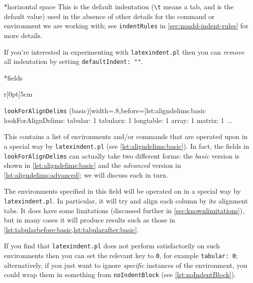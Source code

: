 *{horizontal space}
	This is the default indentation (\lstinline!\t! means a tab, and is the default value) used in the absence of other details
	for the command or environment we are working with; see \texttt{indentRules} in \vref{sec:noadd-indent-rules}
	for more details.

	If you're interested in experimenting with \texttt{latexindent.pl} then you
	can \emph{remove} all indentation by setting \texttt{defaultIndent: ""}.

*{fields}
	\begin{wrapfigure}[12]{r}[0pt]{5cm}
		\begin{yaml}[numbers=none]{\texttt{lookForAlignDelims} (basic)}[width=.8\linewidth,before=\centering]{lst:aligndelims:basic}
lookForAlignDelims:
   tabular: 1
   tabularx: 1
   longtable: 1
   array: 1
   matrix: 1
   ...
	\end{yaml}
	\end{wrapfigure}
	This contains a list of environments and/or commands that
	are operated upon in a special way by \texttt{latexindent.pl} (see \cref{lst:aligndelims:basic}).
	In fact, the fields in \texttt{lookForAlignDelims} can actually
	take two different forms: the \emph{basic} version is shown in \cref{lst:aligndelims:basic}
	and the \emph{advanced} version in \cref{lst:aligndelims:advanced}; we will discuss each in turn.

	The environments specified in this field will be operated on in a special way  by \texttt{latexindent.pl}. In particular, it will try and align each column by its alignment
	tabs. It does have some limitations (discussed further in \cref{sec:knownlimitations}),
	but in many cases it will produce results such as those in \cref{lst:tabularbefore:basic,lst:tabularafter:basic}.

	If you find that \texttt{latexindent.pl} does not perform satisfactorily on such
	environments then you can set the relevant key to \texttt{0}, for example \texttt{tabular: 0}; alternatively, if you just want to ignore \emph{specific}
	instances of the environment, you could wrap them in something from \texttt{noIndentBlock} (see \cref{lst:noIndentBlock}).

	\begin{minipage}{.45\textwidth}
	\end{minipage}%
	\hfill
	\begin{minipage}{.45\textwidth}
	\end{minipage}%

